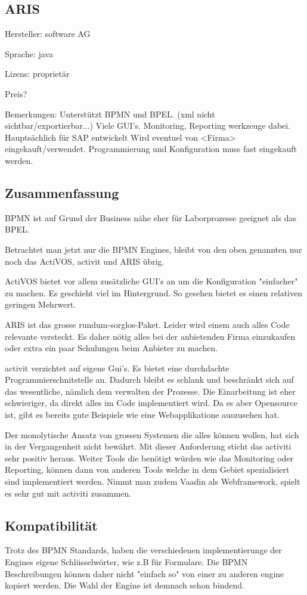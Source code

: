 \documentclass[paper=a4,twoside=false,BCOR=0mm,DIV=calc,fontsize=12pt]{scrartcl}
\begin{document}
\subsection{ARIS}
Hersteller: software AG

Sprache: java

Lizens: proprietär

Preis?

Bemerkungen:
Unterstützt BPMN und BPEL. (xml nicht sichtbar/exportierbar...)
Viele GUI's. 
Monitoring, Reporting werkzeuge dabei.
Hauptsächlich für SAP entwickelt
Wird eventuel von <Firma> eingekauft/verwendet.
Programmierung und Konfiguration muss fast eingekauft werden.



\subsection{Zusammenfassung}
BPMN ist auf Grund der Business nähe eher für Laborprozesse geeignet als das BPEL.

Betrachtet man jetzt nur die BPMN Engines, bleibt von den oben genannten nur noch das ActiVOS, activit und ARIS übrig.

ActiVOS bietet vor allem zusätzliche GUI's an um die Konfiguration "einfacher" zu machen. Es geschieht viel im Hintergrund. 
So gesehen bietet es einen relativen geringen Mehrwert. 

ARIS ist das grosse rundum-sorglos-Paket. Leider wird einem auch alles Code relevante versteckt. Es daher nötig alles bei der anbietenden
Firma einzukaufen oder extra ein paar Schulungen beim Anbieter zu machen.

activit verzichtet auf eigene Gui's. Es bietet eine durchdachte Programmierschnitstelle an. Dadurch bleibt es schlank und beschränkt sich
auf das wesentliche, nämlich dem verwalten der Prozesse. Die Einarbeitung ist eher schwieriger, da direkt alles im Code implementiert wird.
Da es aber Opensource ist, gibt es bereits gute Beispiele wie eine Webapplikatione auszusehen hat.

Der monolytische Ansatz von grossen Systemen die alles können wollen, hat sich in der Vergangenheit nicht bewährt. Mit dieser Anforderung
sticht das activiti sehr positiv heraus. Weiter Tools die benötigt würden wie das Monitoring oder Reporting, können dann von anderen Tools
welche in dem Gebiet spezialisiert sind implementiert werden.
Nimmt man zudem Vaadin als Webframework, spielt es sehr gut mit activiti zusammen.


\subsection{Kompatibilität}
Trotz des BPMN Standards, haben die verschiedenen implementierunge der Engines eigene Schlüsselwörter, wie z.B für Formulare. 
Die BPMN Beschreibungen können daher nicht "einfach so" von einer zu anderen engine kopiert werden. 
Die Wahl der Engine ist demnach schon bindend.
\end{document}

